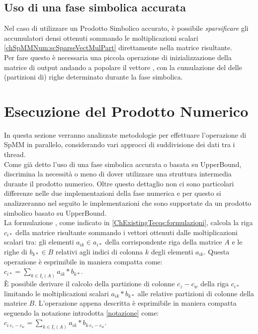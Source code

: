 \subsection{Uso di una fase simbolica accurata}
Nel caso di utilizzare un Prodotto Simbolico accurato, è possibile \emph{sparsificare}
gli accumulatori densi ottenuti sommando le moltiplicazioni scalari \ref{chSpMMNum:scSparseVectMulPart}
direttamente nella matrice risultante.\\
Per fare questo è necessaria una piccola operazione di inizializzazione della matrice di output
andando a popolare il vettore , con la cumulazione del \nnnz delle 
(partizioni di) righe determinato durante la fase simbolica.\\

\section{Esecuzione del Prodotto Numerico}
In questa sezione verranno analizzate metodologie per effettuare l'operazione di SpMM in parallelo,
considerando vari approcci di suddivisione dei dati tra i thread.\\
Come già detto l'uso di una fase simbolica accurata o basata su UpperBound, discrimina la necessità 
o meno di dover utilizzare una struttura intermedia durante il prodotto numerico.
Oltre questo dettaglio non ci sono particolari differenze nelle due implementazioni della fase numerica
e per questo si analizzeranno nel seguito le implementazioni che sono supportate da un prodotto simbolico basato su UpperBound.\\
La formulazione \rowbyrow, come indicato in \ref{ChExistingTecqs:formulazioni}, 
calcola la riga $c_{i*}$ della matrice risultante sommando i vettori ottenuti dalle moltiplicazioni scalari tra:
gli elementi $a_{ik} \in a_{i*}$ della corrispondente riga della matrice $A$ e  
le righe di $b_{k*} \in B$ relativi agli indici di colonna $k$ degli elementi $a_{ik}$.
Questa operazione è esprimibile in maniera compatta come:\\
$c_{i*} = \sum\limits_{k \in I_i(A)}  a_{ik} \ast  b_{k*}$.\\
È possibile derivare il calcolo della partizione di colonne $c_z - c_w$ della riga $c_{i*}$
limitando le moltiplicazioni scalari $a_{ik} \ast  b_{k*}$ alle relative partizioni di colonne della matrice $B$. 
L'operazione appena descritta è esprimibile in maniera compatta seguendo la notazione introdotta \ref{notazione} come:\\
$c_{i~c_z-c_w} = \sum\limits_{k \in I_i(A)}  a_{ik} \ast  b_{k~c_z-c_w}$.\\

